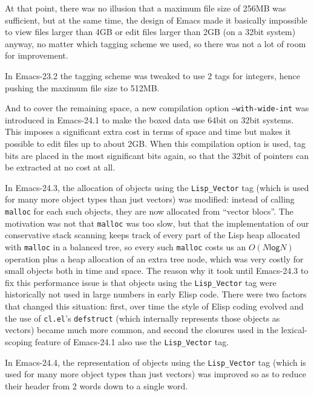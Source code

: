 \documentclass[format=acmsmall, review=false, screen=true]{acmart}
\newcommand \Elisp {Elisp}
\begin{document}
At that point, there was no illusion that a maximum file size of 256MB was
sufficient, but at the same time, the design of Emacs made it basically
impossible to view files larger than 4GB or edit files larger than 2GB (on
a 32bit system) anyway, no matter which tagging scheme we used, so there was
not a lot of room for improvement.

In Emacs-23.2 the tagging scheme was tweaked to use 2 tags for integers,
hence pushing the maximum file size to 512MB.

And to cover the remaining space, a new compilation option
\texttt{--with-wide-int} was introduced in Emacs-24.1 to make the boxed data
use 64bit on 32bit systems.  This imposes a significant extra cost in terms
of space and time but makes it possible to edit files up to about 2GB.
When this compilation option is used, tag bits are placed in the most
significant bits again, so that the 32bit of pointers can be extracted at no
cost at all.


In Emacs-24.3, the allocation of objects using the \texttt{Lisp\_Vector} tag
(which is used for many more object types than just vectors) was modified:
instead of calling \texttt{malloc} for each such objects, they are now
allocated from ``vector blocs''.  The motivation was not that
\texttt{malloc} was too slow, but that the implementation of our
conservative stack scanning keeps track of every part of the Lisp heap
allocated with \texttt{malloc} in a balanced tree, so every such
\texttt{malloc} costs us an $O(N \textsf{log} N)$ operation plus a heap
allocation of an extra tree node, which was very costly for small objects
both in time and space.  The reason why it took until Emacs-24.3 to fix this
performance issue is that objects using the \texttt{Lisp\_Vector} tag were
historically not used in large numbers in early \Elisp{} code.  There were
two factors that changed this situation: first, over time the style of
\Elisp{} coding evolved and the use of \texttt{cl.el}'s \texttt{defstruct}
(which internally represents those objects as vectors) became much more
common, and second the closures used in the lexical-scoping feature of
Emacs-24.1 also use the \texttt{Lisp\_Vector} tag.

In Emacs-24.4, the representation of objects using the \texttt{Lisp\_Vector}
tag (which is used for many more object types than just vectors) was
improved so as to reduce their header from 2 words down to a single word.
\end{document}
